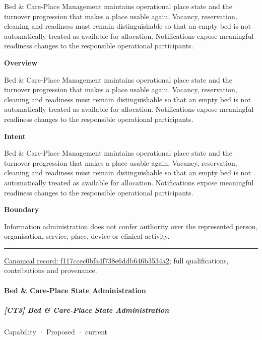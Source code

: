 Bed \& Care-Place Management maintains operational place state and the turnover progression that makes a place usable again. Vacancy, reservation, cleaning and readiness must remain distinguishable so that an empty bed is not automatically treated as available for allocation. Notifications expose meaningful readiness changes to the responsible operational participants.



\textbf{Overview}



Bed \& Care-Place Management maintains operational place state and the turnover progression that makes a place usable again. Vacancy, reservation, cleaning and readiness must remain distinguishable so that an empty bed is not automatically treated as available for allocation. Notifications expose meaningful readiness changes to the responsible operational participants.



\textbf{Intent}



Bed \& Care-Place Management maintains operational place state and the turnover progression that makes a place usable again. Vacancy, reservation, cleaning and readiness must remain distinguishable so that an empty bed is not automatically treated as available for allocation. Notifications expose meaningful readiness changes to the responsible operational participants.



\textbf{Boundary}



Information administration does not confer authority over the represented person, organisation, service, place, device or clinical activity.



\medskip\hrule\medskip

{\footnotesize \href{../../../../continuum/strategy/capability/f117ccec0bfa4f738e6ddb646b3534a2.md}{Canonical record: f117ccec0bfa4f738e6ddb646b3534a2}; full qualifications, contributions and provenance.}\par
\paragraph{Bed \& Care-Place State Administration}

\subparagraph{[CT3] Bed \& Care-Place State Administration}

\label{element:26a9383d7bb146a19141558d232843de}
{\small Capability · Proposed · current}\par

